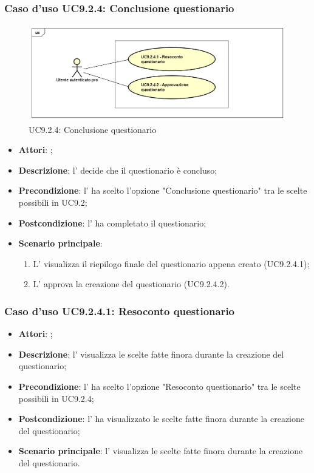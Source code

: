 		\subsubsection{Caso d'uso UC9.2.4: Conclusione questionario}
		\label{UC9.2.4}
		\begin{figure}[h]
			\centering
			\includegraphics[scale=0.5,keepaspectratio]{UML/UC9_2_4.png}
			\caption{UC9.2.4: Conclusione questionario}
		\end{figure}
		\FloatBarrier
		\begin{itemize}
			\item \textbf{Attori}: \uaupro{}; 
			\item \textbf{Descrizione}: l'\uaupro{} decide che il questionario è concluso;
			\item \textbf{Precondizione}: l'\uaupro{} ha scelto l'opzione "Conclusione questionario" tra le scelte possibili in UC9.2;
			\item \textbf{Postcondizione}: l'\uaupro{} ha completato il questionario;
			\item \textbf{Scenario principale}: 
				\begin{enumerate}
					\item L'\uaupro{} visualizza il riepilogo finale del questionario appena creato (UC9.2.4.1); 
					\item L'\uaupro{} approva la creazione del questionario (UC9.2.4.2).
				\end{enumerate}
		\end{itemize}
				
			\subsubsection{Caso d'uso UC9.2.4.1: Resoconto questionario}
			\label{UC9.2.4.1}
			\begin{itemize}
				\item \textbf{Attori}: \uaupro{};
				\item \textbf{Descrizione}: l'\uaupro{} visualizza le scelte fatte finora durante la creazione del questionario;
				\item \textbf{Precondizione}: l'\uaupro{} ha scelto l'opzione "Resoconto questionario" tra le scelte possibili in UC9.2.4;
				\item \textbf{Postcondizione}: l'\uaupro{} ha visualizzato le scelte fatte finora durante la creazione del questionario;
				\item \textbf{Scenario principale}: l'\uaupro{} visualizza le scelte fatte finora durante la creazione del questionario.
			\end{itemize}
			
